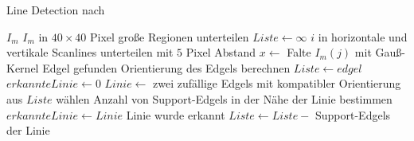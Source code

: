 \begin{algorithm}[!ht]\small
\caption{Line Detection nach \citeauthor{clarke96}}
\label{alg:linedetection-clarke-overview}
\begin{algorithmic}[1]
	\Require $I_m$
	\State $I_m$ in $40 \times 40$ Pixel große Regionen unterteilen
			\State $Liste \gets \infty$
			\State $i$ in horizontale und vertikale Scanlines unterteilen mit $5$ Pixel Abstand
				\State $x \gets$ Falte $I_m\left(j\right)$ mit Gauß-Kernel
					\Comment Edgel gefunden
					\State Orientierung des Edgels berechnen
					\State $Liste \gets edgel$
				\EndIf
			\EndFor
				\State $erkannteLinie \gets 0$
					\State $Linie \gets$ zwei zufällige Edgels mit kompatibler Orientierung aus $Liste$ wählen
					\State Anzahl von Support-Edgels in der Nähe der Linie bestimmen
						\State $erkannteLinie \gets Linie$
					\EndIf
				\EndFor
					\Comment Linie wurde erkannt
					\State $Liste \gets Liste -$ Support-Edgels der Linie
				\EndIf
			\EndWhile
		\EndFor
	\end{algorithmic}
\end{algorithm}

